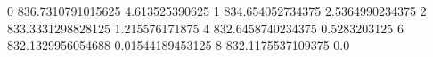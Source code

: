 0 836.7310791015625 4.613525390625
1 834.654052734375 2.5364990234375
2 833.3331298828125 1.215576171875
4 832.6458740234375 0.5283203125
6 832.1329956054688 0.01544189453125
8 832.1175537109375 0.0
